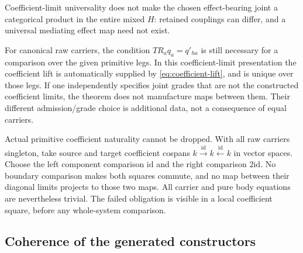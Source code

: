 \documentclass[11pt]{article}
\newcommand{\id}{\mathrm{id}}
\begin{document}
Coefficient-limit universality does not make the chosen effect-bearing joint a categorical product in the entire mixed $H$: retained couplings can differ, and a universal mediating effect map need not exist.

For canonical raw carriers, the condition $TR_aq_a=q'_{ha}$ is still necessary for a comparison over the given primitive legs. In this coefficient-limit presentation the coefficient lift is automatically supplied by \eqref{eq:coefficient-lift}, and is unique over those legs. If one independently specifies joint grades that are not the constructed coefficient limits, the theorem does not manufacture maps between them. Their different admission/grade choice is additional data, not a consequence of equal carriers.

Actual primitive coefficient naturality cannot be dropped. With all raw carriers singleton, take source and target coefficient cospans $k\xrightarrow{\id}k\xleftarrow{\id}k$ in vector spaces. Choose the left component comparison $\id$ and the right comparison $2\id$. No boundary comparison makes both squares commute, and no map between their diagonal limits projects to those two maps. All carrier and pure body equations are nevertheless trivial. The failed obligation is visible in a local coefficient square, before any whole-system comparison.

\subsection{Coherence of the generated constructors}
\end{document}
